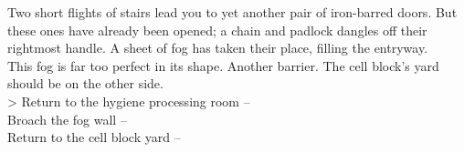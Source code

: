 Two short flights of stairs lead you to yet another pair of iron-barred doors. But these ones have already been opened; a chain and padlock dangles off their rightmost handle. A sheet of fog has taken their place, filling the entryway.\\

This fog is far too perfect in its shape. Another barrier. The cell block’s yard should be on the other side.\\

> Return to the hygiene processing room -- \\
 Broach the fog wall -- \\
 Return to the cell block yard -- 